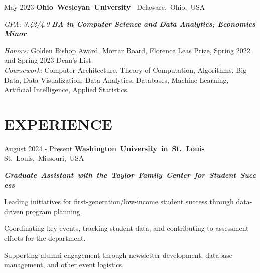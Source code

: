 \documentclass[10pt, letterpaper]{article}
\begin{document}
\vspace{\entrySpacing}
\begin{twocolentry}{May 2023}
    \mbox{\textbf{Ohio Wesleyan University}
        \kern {}
        \AND
        \kern {}}
    \mbox{Delaware, Ohio, USA}
\end{twocolentry}

\begin{twocolentry}{\textsl{GPA: 3.42/4.0}}
    {\textbf{\textsl{BA in Computer Science and Data Analytics; Economics Minor}}}
\end{twocolentry}

\begin{onecolentry}
    \begin{highlights}
        \textit{Honors:} Golden Bishop Award, Mortar Board, Florence Leas Prize, Spring 2022 and Spring 2023 Dean's List.\\
        \textit{Coursework:} Computer Architecture, Theory of Computation, Algorithms, Big Data, Data Visualization, Data Analytics, Databases, Machine Learning, Artificial Intelligence, Applied Statistics.\\
    \end{highlights}
\end{onecolentry}

\vspace{\headerSpacing}
\section{EXPERIENCE}

\vspace{\entrySpacing}
\begin{twocolentry}{August 2024 - Present}
    \mbox{\textbf{Washington University in St. Louis}
        \kern {}
        \AND
        \kern {}}
    \mbox{St. Louis, Missouri, USA}
\end{twocolentry}

\mbox{\textbf{\textsl{Graduate Assistant with the Taylor Family Center for Student Success}}}
\begin{onecolentry}
    \begin{highlightsforbulletentries}
        \item Leading initiatives for first-generation/low-income student success through data-driven program planning.
        \item Coordinating key events, tracking student data, and contributing to assessment efforts for the department.
        \item Supporting alumni engagement through newsletter development, database management, and other event logistics.
    \end{highlightsforbulletentries}
\end{onecolentry}
\end{document}
